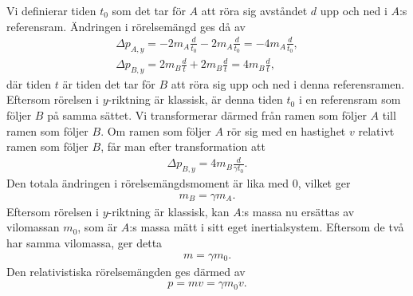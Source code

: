 Vi definierar tiden $t_{0}$ som det tar för $A$ att röra sig avståndet $d$ upp och ned i $A$:s referensram. Ändringen i rörelsemängd ges då av
\begin{align*}
	\Delta p_{A, y} = -2m_{A}\frac{d}{t_{0}} - 2m_{A}\frac{d}{t_{0}} = -4m_{A}\frac{d}{t_{0}}, \\
	\Delta p_{B, y} = 2m_{B}\frac{d}{t} + 2m_{B}\frac{d}{t} = 4m_{B}\frac{d}{t},
\end{align*}
där tiden $t$ är tiden det tar för $B$ att röra sig upp och ned i denna referensramen. Eftersom rörelsen i $y$-riktning är klassisk, är denna tiden $t_{0}$ i en referensram som följer $B$ på samma sättet. Vi transformerar därmed från ramen som följer $A$ till ramen som följer $B$. Om ramen som följer $A$ rör sig med en hastighet $v$ relativt ramen som följer $B$, får man efter transformation att
\begin{align*}
	\Delta p_{B, y} = 4m_{B}\frac{d}{\gamma t_{0}}.
\end{align*}
Den totala ändringen i rörelsemängdsmoment är lika med $0$, vilket ger
\begin{align*}
	m_{B} = \gamma m_{A}.
\end{align*}
Eftersom rörelsen i $y$-riktning är klassisk, kan $A$:s massa nu ersättas av vilomassan $m_{0}$, som är $A$:s massa mätt i sitt eget inertialsystem. Eftersom de två har samma vilomassa, ger detta
\begin{align*}
	m = \gamma m_{0}.
\end{align*}
Den relativistiska rörelsemängden ges därmed av
\begin{align*}
	p = mv = \gamma m_{0}v.
\end{align*}

